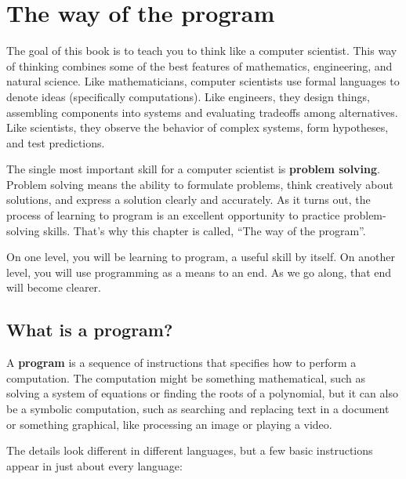 \chapter{The way of the program}

The goal of this book is to teach you to think like a computer
scientist.  This way of thinking combines some of the best features of
mathematics, engineering, and natural science.  Like mathematicians,
computer scientists use formal languages to denote ideas (specifically
computations).  Like engineers, they design things, assembling
components into systems and evaluating tradeoffs among alternatives.
Like scientists, they observe the behavior of complex systems, form
hypotheses, and test predictions.  

The single most important skill for a computer scientist is {\bf
problem solving}.  Problem solving means the ability to formulate
problems, think creatively about solutions, and express a solution
clearly and accurately.  As it turns out, the process of learning to
program is an excellent opportunity to practice problem-solving
skills.  That's why this chapter is called, ``The way of the
program''.

On one level, you will be learning to program, a useful skill by
itself.  On another level, you will use programming as a means to an
end.  As we go along, that end will become clearer.


\section{What is a program?}

A {\bf program} is a sequence of instructions that specifies how to
perform a computation.  The computation might be something
mathematical, such as solving a system of equations or finding the
roots of a polynomial, but it can also be a symbolic computation, such
as searching and replacing text in a document or something
graphical, like processing an image or playing a video.

The details look different in different languages, but a few basic
instructions appear in just about every language:

